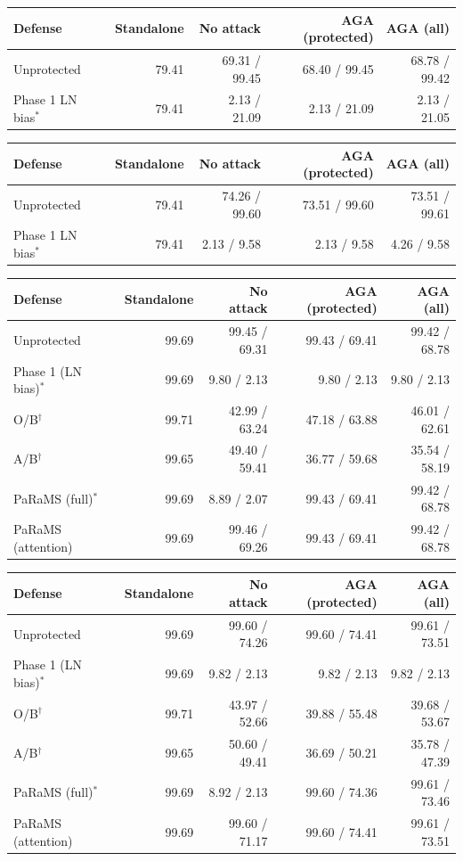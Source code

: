 \begin{tabular}{lrrrr}
\toprule
Defense & Standalone & No attack & AGA (protected) & AGA (all) \\
\midrule
Unprotected & 79.41 & 69.31 / 99.45 & 68.40 / 99.45 & 68.78 / 99.42 \\
Phase 1 LN bias$^{*}$ & 79.41 & 2.13 / 21.09 & 2.13 / 21.09 & 2.13 / 21.05 \\
\bottomrule
\end{tabular}

\begin{tabular}{lrrrr}
\toprule
Defense & Standalone & No attack & AGA (protected) & AGA (all) \\
\midrule
Unprotected & 79.41 & 74.26 / 99.60 & 73.51 / 99.60 & 73.51 / 99.61 \\
Phase 1 LN bias$^{*}$ & 79.41 & 2.13 / 9.58 & 2.13 / 9.58 & 4.26 / 9.58 \\
\bottomrule
\end{tabular}

\begin{tabular}{lrrrr}
\toprule
Defense & Standalone & No attack & AGA (protected) & AGA (all) \\
\midrule
Unprotected & 99.69 & 99.45 / 69.31 & 99.43 / 69.41 & 99.42 / 68.78 \\
Phase 1 (LN bias)$^{*}$ & 99.69 & 9.80 / 2.13 & 9.80 / 2.13 & 9.80 / 2.13 \\
O/B$^{\dagger}$ & 99.71 & 42.99 / 63.24 & 47.18 / 63.88 & 46.01 / 62.61 \\
A/B$^{\dagger}$ & 99.65 & 49.40 / 59.41 & 36.77 / 59.68 & 35.54 / 58.19 \\
PaRaMS (full)$^{*}$ & 99.69 & 8.89 / 2.07 & 99.43 / 69.41 & 99.42 / 68.78 \\
PaRaMS (attention) & 99.69 & 99.46 / 69.26 & 99.43 / 69.41 & 99.42 / 68.78 \\
\bottomrule
\end{tabular}

\begin{tabular}{lrrrr}
\toprule
Defense & Standalone & No attack & AGA (protected) & AGA (all) \\
\midrule
Unprotected & 99.69 & 99.60 / 74.26 & 99.60 / 74.41 & 99.61 / 73.51 \\
Phase 1 (LN bias)$^{*}$ & 99.69 & 9.82 / 2.13 & 9.82 / 2.13 & 9.82 / 2.13 \\
O/B$^{\dagger}$ & 99.71 & 43.97 / 52.66 & 39.88 / 55.48 & 39.68 / 53.67 \\
A/B$^{\dagger}$ & 99.65 & 50.60 / 49.41 & 36.69 / 50.21 & 35.78 / 47.39 \\
PaRaMS (full)$^{*}$ & 99.69 & 8.92 / 2.13 & 99.60 / 74.36 & 99.61 / 73.46 \\
PaRaMS (attention) & 99.69 & 99.60 / 71.17 & 99.60 / 74.41 & 99.61 / 73.51 \\
\bottomrule
\end{tabular}

